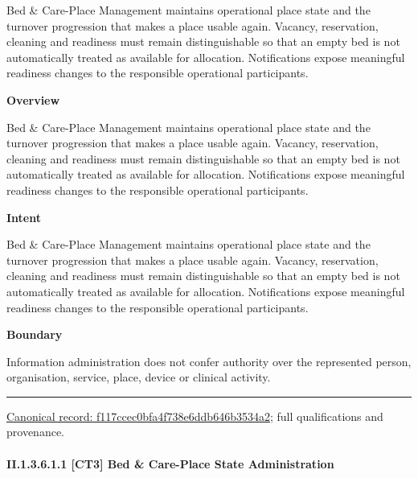 Bed \& Care-Place Management maintains operational place state and the turnover progression that makes a place usable again. Vacancy, reservation, cleaning and readiness must remain distinguishable so that an empty bed is not automatically treated as available for allocation. Notifications expose meaningful readiness changes to the responsible operational participants.



\textbf{Overview}



Bed \& Care-Place Management maintains operational place state and the turnover progression that makes a place usable again. Vacancy, reservation, cleaning and readiness must remain distinguishable so that an empty bed is not automatically treated as available for allocation. Notifications expose meaningful readiness changes to the responsible operational participants.



\textbf{Intent}



Bed \& Care-Place Management maintains operational place state and the turnover progression that makes a place usable again. Vacancy, reservation, cleaning and readiness must remain distinguishable so that an empty bed is not automatically treated as available for allocation. Notifications expose meaningful readiness changes to the responsible operational participants.



\textbf{Boundary}



Information administration does not confer authority over the represented person, organisation, service, place, device or clinical activity.



\medskip\hrule\medskip

{\footnotesize \href{../../../../../../../continuum/strategy/capability/f117ccec0bfa4f738e6ddb646b3534a2.md}{Canonical record: f117ccec0bfa4f738e6ddb646b3534a2}; full qualifications and provenance.}\par
\paragraph*{II.1.3.6.1.1 [CT3] Bed \& Care-Place State Administration}
\label{navigation:II.1.3.6.1.1}

